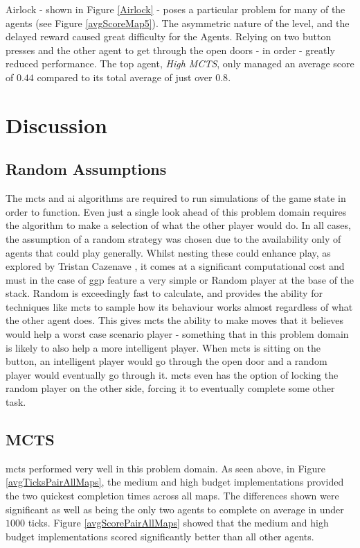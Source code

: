 \documentclass{IEEEtran}
\begin{document}
Airlock - shown in Figure \ref{Airlock} - poses a particular problem for many of the agents (see Figure \ref{avgScoreMap5}). The asymmetric nature of the level, and the delayed reward caused great difficulty for the Agents. Relying on two button presses and the other agent to get through the open doors - in order - greatly reduced performance. The top agent, \emph{High MCTS}, only managed an average score of $0.44$ compared to its total average of just over $0.8$.

\section{Discussion}
\subsection{Random Assumptions}
The \gls{mcts} and \gls{ai} algorithms are required to run simulations of the game state in order to function. Even just a single look ahead of this problem domain requires the algorithm to make a selection of what the other player would do. In all cases, the assumption of a random strategy was chosen due to the availability only of agents that could play generally. Whilst nesting these could enhance play, as explored by Tristan Cazenave \cite{cazenave2007reflexive}, it comes at a significant computational cost and must in the case of \gls{ggp} feature a very simple or Random player at the base of the stack. Random is exceedingly fast to calculate, and provides the ability for techniques like \gls{mcts} to sample how its behaviour works almost regardless of what the other agent does. This gives \gls{mcts} the ability to make moves that it believes would help a worst case scenario player - something that in this problem domain is likely to also help a more intelligent player. When \gls{mcts} is sitting on the button, an intelligent player would go through the open door and a random player would eventually go through it. \gls{mcts} even has the option of locking the random player on the other side, forcing it to eventually complete some other task.

\subsection{MCTS}
\gls{mcts} performed very well in this problem domain. As seen above, in Figure \ref{avgTicksPairAllMaps}, the medium and high budget implementations provided the two quickest completion times across all maps. The differences shown were significant as well as being the only two agents to complete on average in under $1000$ ticks.  Figure \ref{avgScorePairAllMaps} showed that the medium and high budget implementations scored significantly better than all other agents.
\end{document}
